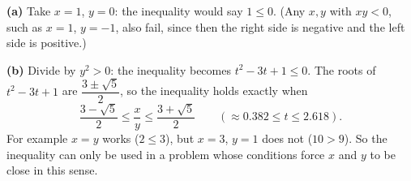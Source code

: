 \textbf{(a)} Take $x=1$, $y=0$: the inequality would say $1\le0$. (Any $x,y$ with $xy<0$, such as $x=1$, $y=-1$, also fail, since then the right side is negative and the left side is positive.)

\textbf{(b)} Divide by $y^2>0$: the inequality becomes $t^2-3t+1\le0$. The roots of $t^2-3t+1$ are $\dfrac{3\pm\sqrt5}{2}$, so the inequality holds exactly when
\[
\boxed{\dfrac{3-\sqrt5}{2}\le\dfrac {x}{y}\le\dfrac{3+\sqrt5}{2}}\qquad(\approx0.382\le t\le2.618).
\]
For example $x=y$ works ($2\le3$), but $x=3$, $y=1$ does not ($10>9$). So the inequality can only be used in a problem whose conditions force $x$ and $y$ to be close in this sense.

